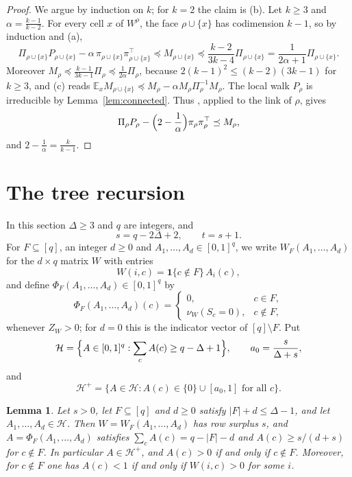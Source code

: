 \documentclass{amsart}
\numberwithin{equation}{section}
\theoremstyle{plain}
\newtheorem{lemma}[theorem]{Lemma}
\theoremstyle{definition}
\theoremstyle{remark}
\newcommand{\E}{\mathbb{E}}
\newcommand{\cH}{\mathcal{H}}
\newcommand{\T}{\top}
\newcommand{\one}{\mathbf{1}}
\begin{document}
\begin{proof}
We argue by induction on $k$; for $k=2$ the claim is (b). Let $k\ge3$ and $\alpha=\frac{k-1}{k-2}$. For every cell $x$ of $W^\rho$, the face $\rho\cup\{x\}$ has codimension $k-1$, so by induction and (a),
\[
\Pi_{\rho\cup\{x\}}P_{\rho\cup\{x\}}-\alpha\,\pi_{\rho\cup\{x\}}\pi_{\rho\cup\{x\}}^\T\preceq M_{\rho\cup\{x\}}\preceq\frac{k-2}{3k-4}\Pi_{\rho\cup\{x\}}=\frac{1}{2\alpha+1}\Pi_{\rho\cup\{x\}}.
\]
Moreover $M_\rho\preceq\frac{k-1}{3k-1}\Pi_\rho\preceq\frac1{2\alpha}\Pi_\rho$, because $2(k-1)^2\le(k-2)(3k-1)$ for $k\ge3$, and (c) reads $\E_xM_{\rho\cup\{x\}}\preceq M_\rho-\alpha M_\rho\Pi_\rho^{-1}M_\rho$. The local walk $P_\rho$ is irreducible by Lemma~\ref{lem:connected}. Thus \cite[Theorem~3.2]{ALG}, applied to the link of $\rho$, gives
\[
\Pi_\rho P_\rho-\Bigl(2-\frac1\alpha\Bigr)\pi_\rho\pi_\rho^\T\preceq M_\rho,
\]
and $2-\frac1\alpha=\frac{k}{k-1}$.
\end{proof}

\section{The tree recursion}\label{sec:tree}

In this section $\Delta\ge3$ and $q$ are integers, and
\[
s=q-2\Delta+2,\qquad t=s+1.
\]
For $F\subseteq[q]$, an integer $d\ge0$ and $A_1,\dots,A_d\in[0,1]^q$, we write $W_F(A_1,\dots,A_d)$ for the $d\times q$ matrix $W$ with entries
\[
W(i,c)=\one\{c\notin F\}\,A_i(c),
\]
and define $\Phi_F(A_1,\dots,A_d)\in[0,1]^q$ by
\[
\Phi_F(A_1,\dots,A_d)(c)=
\begin{cases}0,&c\in F,\\ \nu_W(S_c=0),&c\notin F,\end{cases}
\]
whenever $Z_W>0$; for $d=0$ this is the indicator vector of $[q]\setminus F$. Put
\[
\cH=\Bigl\{A\in[0,1]^q:\sum_cA(c)\ge q-\Delta+1\Bigr\},\qquad
a_0=\frac{s}{\Delta+s},
\]
and
\[
\cH^+=\bigl\{A\in\cH:A(c)\in\{0\}\cup[a_0,1]\text{ for all }c\bigr\}.
\]

\begin{lemma}\label{lem:domain}
Let $s>0$, let $F\subseteq[q]$ and $d\ge0$ satisfy $|F|+d\le\Delta-1$, and let $A_1,\dots,A_d\in\cH$. Then $W=W_F(A_1,\dots,A_d)$ has row surplus $s$, and $A=\Phi_F(A_1,\dots,A_d)$ satisfies $\sum_cA(c)=q-|F|-d$ and $A(c)\ge s/(d+s)$ for $c\notin F$. In particular $A\in\cH^+$, and $A(c)>0$ if and only if $c\notin F$. Moreover, for $c\notin F$ one has $A(c)<1$ if and only if $W(i,c)>0$ for some $i$.
\end{lemma}
\end{document}
